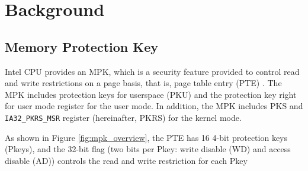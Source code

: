 \section{Background} \label{seciton:background}

\subsection{Memory Protection Key}



Intel CPU provides an MPK, which is a security feature provided to control read
and write restrictions on a page basis, that is, page table entry (PTE)
\cite{intel-mpk}.
%
The MPK includes protection keys for userspace (PKU) and the protection key
right for user mode register for the user mode.
In addition, the MPK includes PKS and \verb|IA32_PKRS_MSR| register
(hereinafter, PKRS) for the kernel mode.

As shown in Figure \ref{fig:mpk_overview}, the PTE has 16 4-bit protection keys
(Pkeys), and the 32-bit flag (two bits per Pkey: write disable (WD) and access
disable (AD)) controls the read and write restriction for each Pkey 

